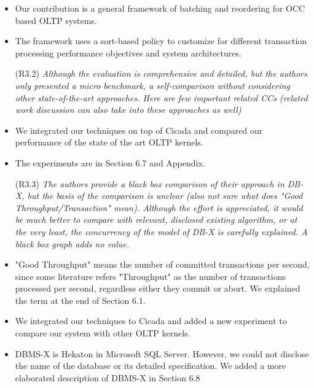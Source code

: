 \documentclass{article}
\newcommand{\changed}[1]{#1}
\newcommand{\changed}[1]{{\color{blue}#1}}
\begin{document}
\changed{
	\begin{itemize}
		\item Our contribution is a general framework of batching and reordering for OCC based OLTP systems.
		\item The framework uses a sort-based policy to customize for different transaction processing performance objectives and system architectures.
	\end{itemize}
}

\begin{itemize}
\item[(R3.2)] \emph{Although the evaluation is comprehensive and detailed, but the authors
	only presented a micro benchmark, a self-comparison without considering
	other state-of-the-art approaches. Here are few important related CCs
	(related work discussion can also take into these approaches as well)}
\end{itemize}

\changed{
	\begin{itemize}
		\item We integrated our techniques on top of Cicada and compared our performance of the state of the art OLTP kernels.
		\item The experiments are in Section 6.7 and Appendix.
	\end{itemize}
}

\begin{itemize}
\item[(R3.3)] \emph{The authors provide a black box comparison of their approach in DB-X,
	but the basis of the comparison is unclear (also not sure what does
	"Good Throughput/Transaction" mean). Although the effort is appreciated,
	it would be much better to compare with relevant, disclosed existing
	algorithm, or at the very least, the concurrency of the model of DB-X is
	carefully explained. A black box graph adds no value.}
\end{itemize}

\changed{
	\begin{itemize}
		\item "Good Throughput" means the number of committed transactions per second, since some literature refers "Throughput" as the number of transactions processed per second, regardless either they commit or abort. We explained the term at the end of Section 6.1.
		\item We integrated our techniques to Cicada and added a new experiment to compare our system with other OLTP kernels.
		\item DBMS-X is Hekaton in Microsoft SQL Server. However, we could not disclose the name of the database or its detailed specification. We added a more elaborated description of DBMS-X in Section 6.8 
	\end{itemize}
}
\end{document}
